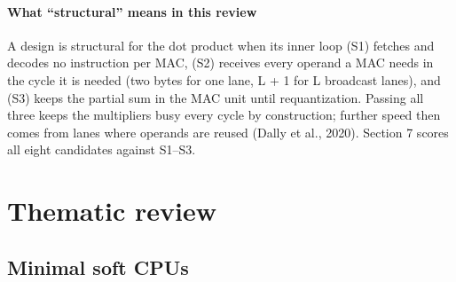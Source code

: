 \paragraph{What “structural” means in this review} A design is structural for the dot product when its inner loop (S1) fetches and decodes no instruction per MAC, (S2) receives every operand a MAC needs in the cycle it is needed (two bytes for one lane, L + 1 for L broadcast lanes), and (S3) keeps the partial sum in the MAC unit until requantization. Passing all three keeps the multipliers busy every cycle by construction; further speed then comes from lanes where operands are reused (Dally et al., 2020). Section 7 scores all eight candidates against S1–S3.

\section{Thematic review}

\subsection{Minimal soft CPUs}


